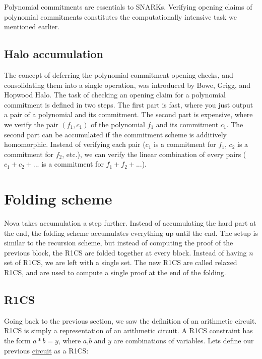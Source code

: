 Polynomial commitments are essentials to SNARKs. Verifying opening claims of polynomial commitments constitutes the computationally intensive task we mentioned earlier. \cite{VR23}




\subsection{Halo accumulation}


The concept of deferring the polynomial commitment opening checks, and consolidating them into a single operation, was introduced by Bowe, Grigg, and Hopwood Halo.\cite{BGH23}
The task of checking an opening claim for a polynomial commitment is defined in two steps.
The first part is fast, where you just output a pair of a polynomial and its commitment. The second part is expensive, where we verify the pair $(f_1, c_1)$ of the polynomial $f_1$ and its commitment $c_1$.
The second part can be accumulated if the commitment scheme is additively homomorphic.
Instead of verifying each pair ($c_1$ is a commitment for $f_1$, $c_2$ is a commitment for $f_2$, etc.), we can verify the linear combination of every pairs ($c_1+c_2+...$ is a commitment for $f_1+f_2+...$). \cite{VR23}




\section{Folding scheme}
Nova takes accumulation a step further. Instead of accumulating the hard part at the end, the folding scheme accumulates everything up until the end.
The setup is similar to the recursion scheme, but instead of computing the proof of the previous block, the R1CS are folded together at every block.
Instead of having $n$ set of R1CS, we are left with a single set. The new R1CS are called relaxed R1CS, and are used to compute a single proof at the end of the folding.
\cite{Nova23}  \cite{ASI23}




\subsection{R1CS}
Going back to the previous section, we saw the definition of an arithmetic circuit.
R1CS is simply a representation of an arithmetic circuit.
A R1CS constraint has the form $a*b=y$, where $a$,$b$ and $y$ are combinations of variables.
Lets define our previous \hyperref[subsec:ac]{circuit} as a R1CS:   


